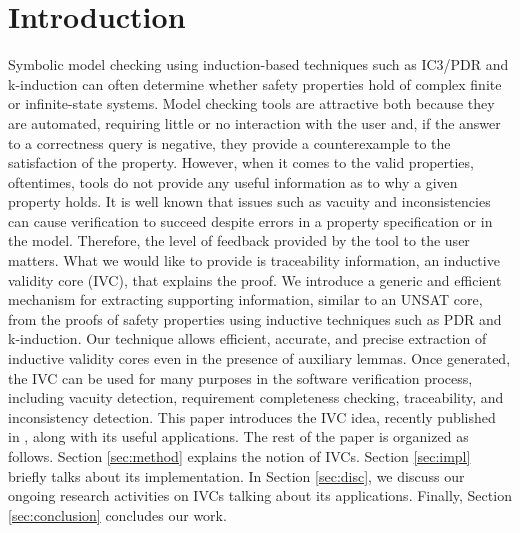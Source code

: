\section{Introduction}
\label{sec:intro}

Symbolic model checking using induction-based techniques such as IC3/PDR and k-induction can often determine whether safety properties hold of complex finite or infinite-state systems.  Model checking tools are attractive both because they are automated, requiring little or no interaction with the user and, if the answer to a correctness query is negative, they provide a counterexample to the satisfaction of the property.  However, when it comes to the valid properties, oftentimes, tools do not provide any useful information as to why a given property holds. It is well known that issues such as vacuity and inconsistencies can cause verification to succeed despite errors in a property specification or in the model. Therefore, the level of feedback provided by the tool to the user matters. What we would like to provide is traceability information, an inductive validity core (IVC), that explains the proof. We introduce a generic and efficient mechanism for extracting supporting information, similar to an UNSAT core, from the proofs of safety properties using inductive techniques such as PDR and k-induction. Our technique allows efficient, accurate, and precise extraction of inductive validity cores even in the presence of auxiliary lemmas.
Once generated, the IVC can be used for many purposes in the software verification process, including vacuity detection, requirement completeness checking, traceability, and inconsistency detection. This paper introduces the IVC idea, recently published in \cite{Ghass16}, along with its useful applications. The rest of the paper is organized as follows. Section \ref{sec:method} explains the notion of IVCs. Section \ref{sec:impl} briefly talks about its implementation. In Section \ref{sec:disc}, we discuss our ongoing research activities on IVCs talking about its applications. Finally, Section \ref{sec:conclusion} concludes our work.

